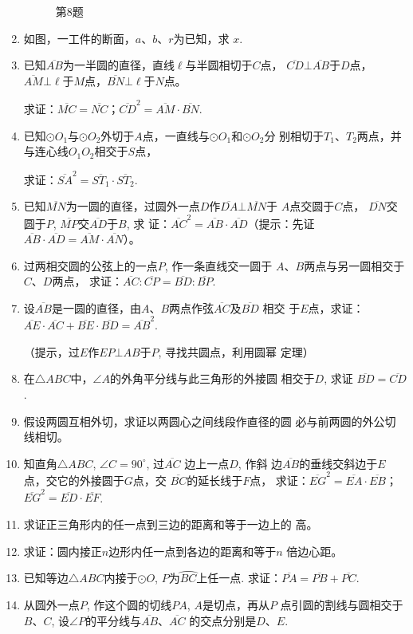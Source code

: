 \begin{enumerate}
\begin{figure}[htp]
\begin{minipage}[t]{0.48\textwidth}
\begin{tikzpicture}[>=latex, scale=1.5]
    \end{tikzpicture}
    \caption*{第8题}
    \end{minipage}
    \end{figure}

\item 如图，一工件的断面，$a$、$b$、$r$为已知，求
$x$.
\item 已知$\overline{AB}$为一半圆的直径，直线$\ell$与半圆相切于$C$点，
$\overline{CD}\bot\overline{AB}$于$D$点，$\overline{AM}\bot \ell$于$M$点，$\overline{BN}\bot \ell$于$N$点。

求证：$\overline{MC}=\overline{NC}$；$\overline{CD}^2=\overline{AM}\cdot \overline{BN}$.

\item 已知$\odot O_1$与$\odot O_2$外切于$A$点，一直线与$\odot O_1$和$\odot O_2$分
别相切于$T_1$、$T_2$两点，并与连心线$O_1O_2$相交于$S$点，

求证：$\overline{SA}^2=\overline{ST_1}\cdot \overline{ST_2}$.
\item 已知$\overline{MN}$为一圆的直径，过圆外一点$D$作$\overline{DA}\bot \overline{MN}$于
$A$点交圆于$C$点，
$\overline{DN}$交圆于$P$, $\overline{MP}$交$\overline{AD}$于$B$, 求
证：$\overline{AC}^2=\overline{AB}\cdot \overline{AD}$（提示：先证$\overline{AB}\cdot \overline{AD}=\overline{AM}\cdot 
\overline{AN}$）。
\item 过两相交圆的公弦上的一点$P$, 作一条直线交一圆于
$A$、$B$两点与另一圆相交于$C$、$D$两点，
求证：$\overline{AC}:\overline{CP}=\overline{BD}:\overline{BP}$.
\item 设$\overline{AB}$是一圆的直径，由$A$、$B$两点作弦$\overline{AC}$及$\overline{BD}$
相交
于$E$点，求证：$\overline{AE}\cdot \overline{AC}+\overline{BE}\cdot \overline{BD}=\overline{AB}^2$.

（提示，过$E$作$EP\bot AB$于$P$, 寻找共圆点，利用圆幂
定理）
\item 在$\triangle ABC$中，$\angle A$的外角平分线与此三角形的外接圆
相交于$D$, 求证 $\overline{BD}=\overline{CD}$.
\item 假设两圆互相外切，求证以两圆心之间线段作直径的圆
必与前两圆的外公切线相切。
\item 知直角$\triangle ABC$, $\angle C=90^{\circ}$, 过$\overline{AC}$
边上一点$D$, 作斜
边$\overline{AB}$的垂线交斜边于$E$点，交它的外接圆于$G$点，交
$\overline{BC}$的延长线于$F$点，
求证：$\overline{EG}^2=\overline{EA}\cdot \overline{EB}$；$\overline{EG}^2=\overline{ED}\cdot \overline{EF}$.
\item 求证正三角形内的任一点到三边的距离和等于一边上的
高。
\item 求证：圆内接正$n$边形内任一点到各边的距离和等于$n$
倍边心距。
\item 已知等边$\triangle ABC$内接于$\odot O$, $P$为$\wideparen{BC}$上任一点. 
求证：$\overline{PA}=\overline{PB}+\overline{PC}$.
\item 从圆外一点$P$, 作这个圆的切线$PA$, $A$是切点，再从$P$
点引圆的割线与圆相交于$B$、$C$, 设$\angle P$的平分线与$\overline{AB}$、$\overline{AC}$
的交点分别是$D$、$E$. 


\end{enumerate}
